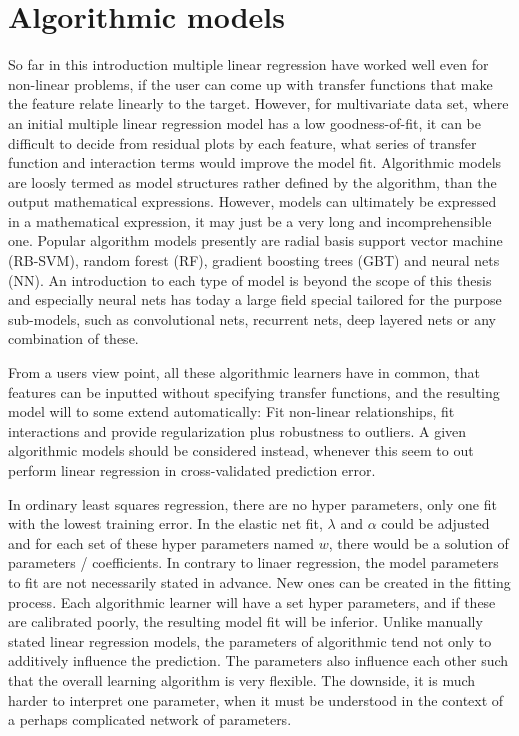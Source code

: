 \section{Algorithmic models}
So far in this introduction multiple linear regression have worked well even for non-linear problems, if the user can come up with transfer functions that make the feature relate linearly to the target. However, for multivariate data set, where an initial multiple linear regression model has a low goodness-of-fit, it can be difficult to decide from residual plots by each feature, what series of transfer function and interaction terms would improve the model fit. Algorithmic models are loosly termed as model structures rather defined by the algorithm, than the output mathematical expressions. However, models can ultimately be expressed in a mathematical expression, it may just be a very long and incomprehensible one. Popular algorithm models presently are radial basis support vector machine (RB-SVM), random forest (RF), gradient boosting trees (GBT) and neural nets (NN). An introduction to each type of model is beyond the scope of this thesis and especially neural nets has today a large field special tailored for the purpose sub-models, such as convolutional nets, recurrent nets, deep layered nets or any combination of these. 

From a users view point, all these algorithmic learners have in common, that features can be inputted without specifying transfer functions, and the resulting model will to some extend automatically: Fit non-linear relationships, fit interactions and provide regularization plus robustness to outliers. A given algorithmic models should be considered instead, whenever this seem to out perform linear regression in cross-validated prediction error.

In ordinary least squares regression, there are no hyper parameters, only one fit with the lowest training error. In the elastic net fit, $\lambda$ and $\alpha$ could be adjusted and for each set of these hyper parameters named $w$, there would be a solution of parameters / coefficients. In contrary to linaer regression, the model parameters to fit are not necessarily stated in advance. New ones can be created in the fitting process. Each algorithmic learner will have a set hyper parameters, and if these are calibrated poorly, the resulting model fit will be inferior. Unlike manually stated linear regression models, the parameters of algorithmic tend not only to additively influence the prediction. The parameters also influence each other such that the overall learning algorithm is very flexible. The downside, it is much harder to interpret one parameter, when it must be understood in the context of a perhaps complicated network of parameters.


